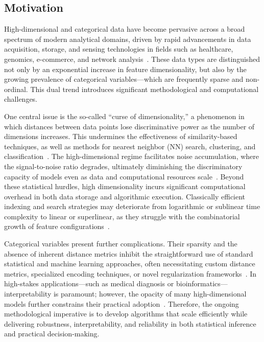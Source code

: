 \documentclass[sigconf]{acmart}
\begin{document}
\subsection{Motivation}

High-dimensional and categorical data have become pervasive across a broad spectrum of modern analytical domains, driven by rapid advancements in data acquisition, storage, and sensing technologies in fields such as healthcare, genomics, e-commerce, and network analysis~\cite{ref1,ref2,ref5,ref6,ref11,ref12,ref30,ref32,ref36,ref37,ref38,ref39,ref42,ref43,ref46,ref52,ref71,ref72,ref73,ref76,ref90,ref93,ref96,ref110}. These data types are distinguished not only by an exponential increase in feature dimensionality, but also by the growing prevalence of categorical variables—which are frequently sparse and non-ordinal. This dual trend introduces significant methodological and computational challenges.

One central issue is the so-called ``curse of dimensionality,'' a phenomenon in which distances between data points lose discriminative power as the number of dimensions increases. This undermines the effectiveness of similarity-based techniques, as well as methods for nearest neighbor (NN) search, clustering, and classification~\cite{ref1,ref5,ref12,ref36,ref76,ref110}. The high-dimensional regime facilitates noise accumulation, where the signal-to-noise ratio degrades, ultimately diminishing the discriminatory capacity of models even as data and computational resources scale~\cite{ref12,ref36,ref39,ref46}. Beyond these statistical hurdles, high dimensionality incurs significant computational overhead in both data storage and algorithmic execution. Classically efficient indexing and search strategies may deteriorate from logarithmic or sublinear time complexity to linear or superlinear, as they struggle with the combinatorial growth of feature configurations~\cite{ref2,ref5,ref32,ref43,ref90}.

Categorical variables present further complications. Their sparsity and the absence of inherent distance metrics inhibit the straightforward use of standard statistical and machine learning approaches, often necessitating custom distance metrics, specialized encoding techniques, or novel regularization frameworks~\cite{ref39,ref52,ref71,ref72,ref73,ref93}. In high-stakes applications—such as medical diagnosis or bioinformatics—interpretability is paramount; however, the opacity of many high-dimensional models further constrains their practical adoption~\cite{ref11,ref37,ref46,ref96,ref110}. Therefore, the ongoing methodological imperative is to develop algorithms that scale efficiently while delivering robustness, interpretability, and reliability in both statistical inference and practical decision-making.
\end{document}
